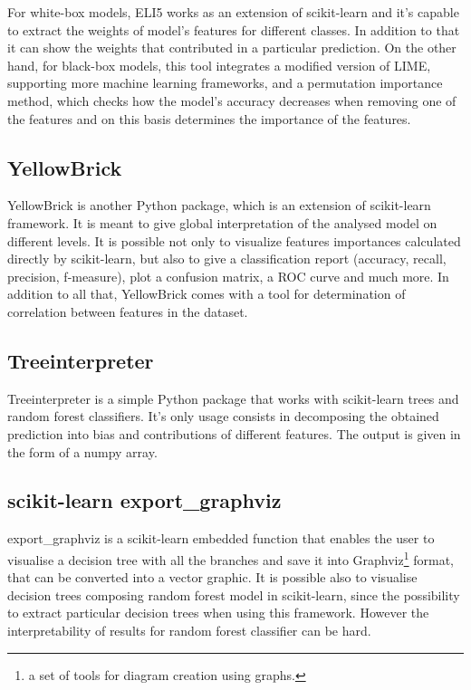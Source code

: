 For white-box models, ELI5 works as an extension of scikit-learn and it's capable to extract the weights of model's features for different classes. In addition to that it can show the weights that contributed in a particular prediction. On the other hand, for black-box models, this tool integrates a modified version of LIME, supporting more machine learning frameworks, and a permutation importance method, which checks how the model's accuracy decreases when removing one of the features and on this basis determines the importance of the features.

\subsection{YellowBrick}
YellowBrick is another Python package, which is an extension of scikit-learn framework. It is meant to give global interpretation of the analysed model on different levels. It is possible not only to visualize features importances calculated directly by scikit-learn, but also to give a classification report (accuracy, recall, precision, f-measure), plot a confusion matrix, a ROC curve and much more. In addition to all that, YellowBrick comes with a tool for determination of correlation between features in the dataset.

\subsection{Treeinterpreter}
Treeinterpreter is a simple Python package that works with scikit-learn trees and random forest classifiers. It's only usage consists in decomposing the obtained prediction into bias and contributions of different features. The output is given in the form of a numpy array.

\subsection{scikit-learn export\_graphviz}
export\_graphviz is a scikit-learn embedded function that enables the user to visualise a decision tree with all the branches and save it into Graphviz\footnote{a set of tools for diagram creation using graphs.} format, that can be converted into a vector graphic. It is possible also to visualise decision trees composing random forest model in scikit-learn, since the possibility to extract particular decision trees when using this framework. However the interpretability of results for random forest classifier can be hard.

